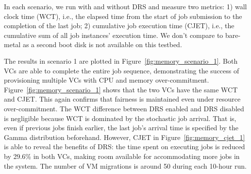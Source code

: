 In each scenario, we run with and without DRS and measure two metrics: 1) wall clock time (WCT), i.e., the elapsed time from the start of job submission to the completion of the last job; 2) cumulative job execution time (CJET), i.e., the cumulative sum of all job instances' execution time. We don't compare to bare-metal as a second boot disk is not available on this testbed. 

The results in scenario 1 are plotted in Figure~\ref{fig:memory_scenario_1}. 
Both VCs are able to complete the entire job sequence, demonstrating the success of 
provisioning multiple VCs with CPU and memory over-commitment. 
Figure~\ref{fig:memory_scenario_1} shows that the two 
VCs have the same WCT and CJET. This again confirms that fairness is maintained even 
under resource over-commitment. The WCT difference between DRS enabled and DRS disabled 
is negligible because WCT is dominated by the stochastic job arrival. That is, 
even if previous jobs finish earlier, the last job's arrival time is specified 
by the Gamma distribution beforehand. 
However, CJET in 
Figure~\ref{fig:memory_cjet_1} is able to reveal the benefits of DRS: the time spent on executing jobs is reduced by 29.6\% in both VCs, 
making room available for accommodating more jobs in the system. The number of VM migrations 
is around 50 during each 10-hour run. 

